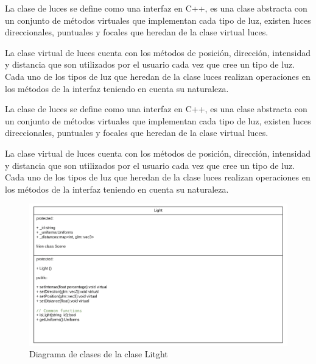 \documentclass[a4paper, 17pt]{book}
\begin{document}
La clase de luces se define como una interfaz en C++, es una clase abstracta con un conjunto de métodos virtuales que implementan cada
tipo de luz, existen luces direccionales, puntuales y focales que heredan de la clase virtual luces.

\vspace{1mm} %

La clase virtual de luces cuenta con los métodos de posición, dirección, intensidad y distancia que son utilizados por el usuario cada
vez que cree un tipo de luz. Cada uno de los tipos de luz que heredan de la clase luces realizan operaciones en los métodos de la
interfaz teniendo en cuenta su naturaleza.

\vspace{1mm} %

La clase de luces se define como una interfaz en C++, es una clase abstracta con un conjunto de métodos virtuales que implementan cada tipo
de luz, existen luces direccionales, puntuales y focales que heredan de la clase virtual luces.

\vspace{1mm} %

La clase virtual de luces cuenta con los métodos de posición, dirección, intensidad y distancia que son utilizados por el usuario cada
vez que cree un tipo de luz. Cada uno de los tipos de luz que heredan de la clase luces realizan operaciones en los métodos de la
interfaz teniendo en cuenta su naturaleza.

\begin{figure}[H]
    \centering
    \includegraphics[scale=0.30, keepaspectratio]{img/Litght.png}
    \caption{Diagrama de clases de la clase Litght}
    \label{figura:Component}
\end{figure}
\end{document}

